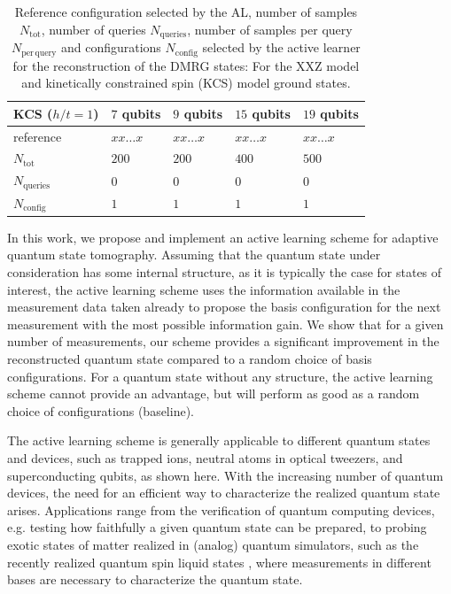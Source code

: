 \documentclass[pra,aps,showpacs,groupedaddress,superscriptaddress,twocolumn,toc=flat,biblatex,footinbib]{revtex4-1}
\begin{document}
\begin{table}[t]
\begin{tabular}{p{2.3 cm}|p{1.3 cm}p{1.3 cm}p{1.3 cm}p{1.3 cm}}
\textbf{KCS} ($h/t=1$)                & $7$ qubits & $9$ qubits & $15$ qubits & $19$ qubits \\\hline
reference   &    $xx\dots x$      &       $xx\dots x$  &  $xx\dots x$        &    $xx\dots x$      \\
$N_{\mathrm{tot}}$         &    $200$      &       $200$   &  $400$        &    $500$       \\
$N_{\mathrm{queries}}$  & $0$         &    $0$      & $0$  &  $0$   \\  
$N_{\mathrm{config}}$  & $1$         &    $1$      & $1$         &  $1$         
\end{tabular}
\caption{Reference configuration selected by the AL, number of samples $N_{\mathrm{tot}}$, number of queries $N_{\mathrm{queries}}$, number of samples per query $N_{\mathrm{per\,query}}$ and configurations $N_{\mathrm{config}}$ selected by the active learner for the reconstruction of the DMRG states: For the XXZ model and kinetically constrained spin (KCS) model ground states.}
\label{tab:Samples_DMRG}
\end{table}










In this work, we propose and implement an active learning scheme for adaptive quantum state tomography.
Assuming that the quantum state under consideration has some internal structure, as it is typically the case for states of interest, the active learning scheme uses the information available in the measurement data taken already to propose the basis configuration for the next measurement with the most possible information gain.
We show that for a given number of measurements, our scheme provides a significant improvement in the reconstructed quantum state compared to a random choice of basis configurations. For a quantum state without any structure, the active learning scheme cannot provide an advantage, but will perform as good as a random choice of configurations (baseline). 

The active learning scheme is generally applicable to different quantum states and devices, such as trapped ions, neutral atoms in optical tweezers, and superconducting qubits, as shown here. With the increasing number of quantum devices, the need for an efficient way to characterize the realized quantum state arises. Applications range from the verification of quantum computing devices, e.g. testing how faithfully a given quantum state can be prepared, to probing exotic states of matter realized in (analog) quantum simulators, such as the recently realized quantum spin liquid states \cite{Semeghini2021,Satzinger2021}, where measurements in different bases are necessary to characterize the quantum state. 
\end{document}
